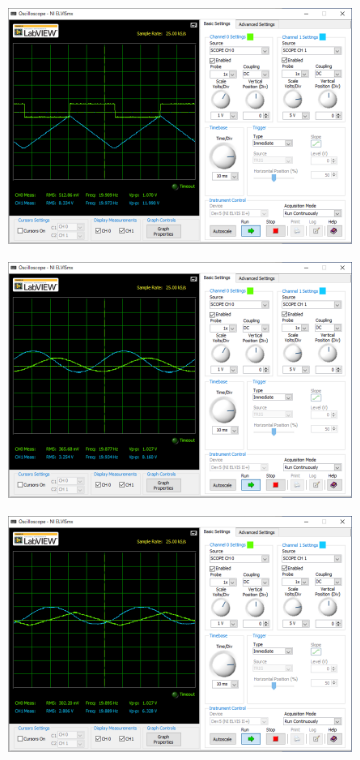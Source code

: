 \begin{figure}[!htb]
	\centering
	\begin{subfigure}{0.48\linewidth}
		\centering
		\includegraphics[width=0.8\linewidth]{src/figures/exp6/int.png}
		\label{fig:exp6-int}
	\end{subfigure}
	\begin{subfigure}{0.48\linewidth}
		\centering
		\includegraphics[width=0.8\linewidth]{src/figures/exp6/int-res-sin.png}
		\label{fig:exp6-int-res-sin}
	\end{subfigure}
	\begin{subfigure}{0.48\linewidth}
		\centering
		\includegraphics[width=0.8\linewidth]{src/figures/exp6/int-res-tri.png}

\end{subfigure}
\end{figure}
